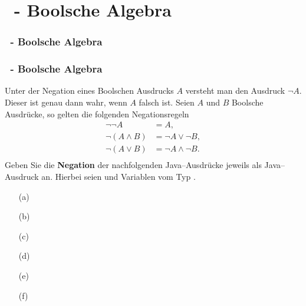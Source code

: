 \def\stitle{\theexercise\ - Boolsche Algebra}
\section{\stitle}
\begin{frame}
    \frametitle{\stitle}
\tableofcontents[current]    
\end{frame}

\begin{frame}[t]%
  \frametitle{\stitle}
\medskip

Unter der Negation eines Boolschen Ausdrucks $A$ versteht man den Ausdruck $\neg A$. Dieser ist genau dann wahr, wenn $A$ falsch ist. Seien $A$ und $B$ Boolsche Ausdrücke, so gelten die folgenden Negationsregeln
\begin{align*}
\neg \neg A &= A,\\
\neg (A \wedge B) &= \neg A \vee \neg B,\\
\neg (A \vee B)   &= \neg A \wedge \neg B. \\
\end{align*}
Geben Sie die \textbf{Negation} der nachfolgenden Java--Ausdrücke jeweils als Java--Ausdruck an. Hierbei seien  und  Variablen vom Typ .\\[1em]
\begin{center}
\begin{minipage}{0.35\textwidth}
\begin{itemize}
\item[(a)] 
\item[(b)] 
\item[(c)] 
\end{itemize}
\end{minipage}
\quad
\begin{minipage}{0.6\textwidth}
\begin{itemize}
\item[(d)] 
\item[(e)] 
\item[(f)] 
\end{itemize}
\end{minipage}
\end{center}

\end{frame}
